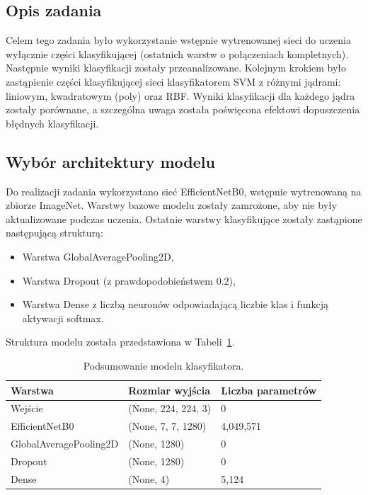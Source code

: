 \subsection{Opis zadania}
Celem tego zadania było wykorzystanie wstępnie wytrenowanej sieci do uczenia wyłącznie części klasyfikującej (ostatnich warstw o połączeniach kompletnych). Następnie wyniki klasyfikacji zostały przeanalizowane. Kolejnym krokiem było zastąpienie części klasyfikującej sieci klasyfikatorem SVM z różnymi jądrami: liniowym, kwadratowym (poly) oraz RBF. Wyniki klasyfikacji dla każdego jądra zostały porównane, a szczególna uwaga została poświęcona efektowi dopuszczenia błędnych klasyfikacji.

\subsection{Wybór architektury modelu}
Do realizacji zadania wykorzystano sieć EfficientNetB0, wstępnie wytrenowaną na zbiorze ImageNet. Warstwy bazowe modelu zostały zamrożone, aby nie były aktualizowane podczas uczenia. Ostatnie warstwy klasyfikujące zostały zastąpione następującą strukturą:
\begin{itemize}
    \item Warstwa GlobalAveragePooling2D,
    \item Warstwa Dropout (z prawdopodobieństwem $0.2$),
    \item Warstwa Dense z liczbą neuronów odpowiadającą liczbie klas i funkcją aktywacji softmax.
\end{itemize}

\noindent Struktura modelu została przedstawiona w Tabeli~\ref{tab:model_summary}.
\begin{table}[h!]
\centering
\begin{tabular}{|l|l|l|}
\hline
\textbf{Warstwa}                  & \textbf{Rozmiar wyjścia}       & \textbf{Liczba parametrów} \\ \hline
Wejście                          & (None, 224, 224, 3)           & 0                          \\ \hline
EfficientNetB0                   & (None, 7, 7, 1280)            & 4,049,571                  \\ \hline
GlobalAveragePooling2D           & (None, 1280)                  & 0                          \\ \hline
Dropout                          & (None, 1280)                  & 0                          \\ \hline
Dense                            & (None, 4)                     & 5,124                      \\ \hline
\end{tabular}
\caption{Podsumowanie modelu klasyfikatora.}
\label{tab:model_summary}
\end{table}

